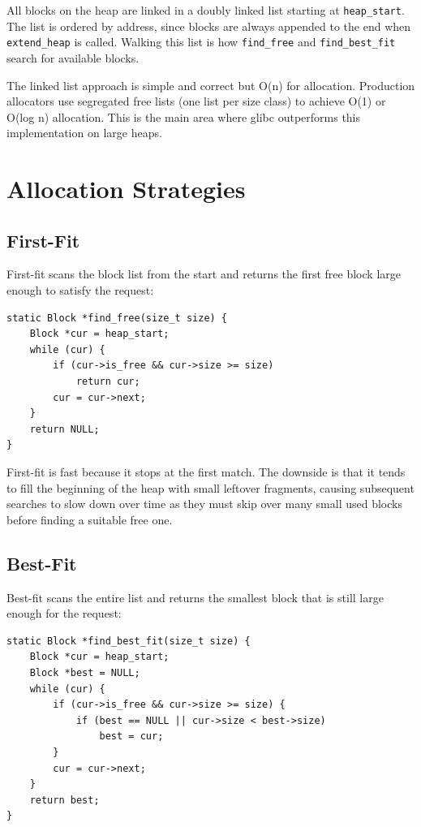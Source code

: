 \documentclass[12pt, a4paper]{report}
\begin{document}
All blocks on the heap are linked in a doubly linked list starting at
\texttt{heap\_start}. The list is ordered by address, since blocks are always
appended to the end when \texttt{extend\_heap} is called. Walking this list is
how \texttt{find\_free} and \texttt{find\_best\_fit} search for available
blocks.

The linked list approach is simple and correct but O(n) for allocation.
Production allocators use segregated free lists (one list per size class) to
achieve O(1) or O(log n) allocation. This is the main area where glibc
outperforms this implementation on large heaps.

\chapter{Allocation Strategies}

\section{First-Fit}

First-fit scans the block list from the start and returns the first free block
large enough to satisfy the request:

\begin{lstlisting}
static Block *find_free(size_t size) {
    Block *cur = heap_start;
    while (cur) {
        if (cur->is_free && cur->size >= size)
            return cur;
        cur = cur->next;
    }
    return NULL;
}
\end{lstlisting}

First-fit is fast because it stops at the first match. The downside is that it
tends to fill the beginning of the heap with small leftover fragments, causing
subsequent searches to slow down over time as they must skip over many small
used blocks before finding a suitable free one.

\section{Best-Fit}

Best-fit scans the entire list and returns the smallest block that is still
large enough for the request:

\begin{lstlisting}
static Block *find_best_fit(size_t size) {
    Block *cur = heap_start;
    Block *best = NULL;
    while (cur) {
        if (cur->is_free && cur->size >= size) {
            if (best == NULL || cur->size < best->size)
                best = cur;
        }
        cur = cur->next;
    }
    return best;
}
\end{lstlisting}
\end{document}
